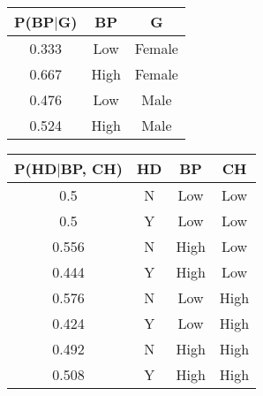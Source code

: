 \documentclass[a4paper,10pt]{report}
\begin{document}
\begin{tabular}{|c|c|c|}\hline
P(BP$|$G) & BP & G  \\ \hline\hline
0.333 & Low & Female \\ \hline
0.667 & High & Female \\ \hline
0.476 & Low  &  Male \\ \hline
0.524 & High & Male \\ \hline
\end{tabular}
\vspace{1em}

\begin{tabular}{|c|c|c|c|}\hline
P(HD$|$BP, CH) & HD & BP & CH  \\ \hline\hline
0.5 & N & Low & Low \\ \hline
0.5 & Y & Low & Low \\ \hline
0.556 & N  & High & Low \\ \hline
0.444 & Y & High & Low \\ \hline
0.576 & N & Low & High\\ \hline
0.424 & Y & Low & High \\ \hline
0.492 & N  & High & High \\ \hline
0.508 & Y & High & High \\ \hline
\end{tabular}
\vspace{1em}
\end{document}
